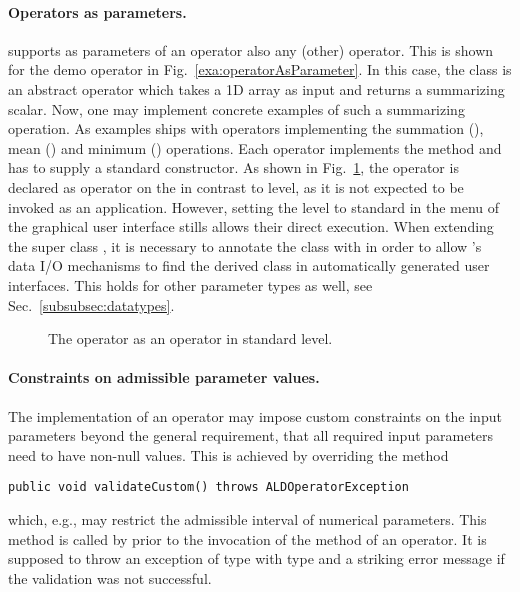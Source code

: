 \paragraph{Operators as parameters.}
\alida supports as parameters of an operator also any (other) \alida operator.
This is shown for the demo operator  in Fig.~\ref{exa:operatorAsParameter}.
In this case, the class  is an abstract operator 
which takes a 1D array as input and returns a summarizing scalar.
Now, one may implement concrete examples of such a summarizing operation. 
As examples \alida ships with operators implementing
the summation (), mean () and minimum
() operations.
Each operator implements the   method and has to supply a
standard constructor.
As shown in Fig.~\ref{exa:ALDArraySum},
the  operator  is declared as operator on the
 in contrast to  level, as
it is not expected to be invoked as an application.
However, setting the level to standard in the menu of the graphical user interface
stills allows their direct execution.
When extending the super class , it is necessary to
annotate the class with  in order to allow \alida's data
I/O mechanisms to find the derived class in automatically generated user
interfaces.
This holds for other parameter types as well, see Sec.~\ref{subsubsec:datatypes}.

\begin{figure}
\vspace{4mm}

\caption{\label{exa:ALDArraySum}The operator  as an operator in standard level.}
\end{figure}

\paragraph{Constraints on admissible parameter values.}

The implementation of an operator may impose 
custom constraints on the input parameters
beyond the general requirement, that all required input parameters
need to have non-null values.
This is achieved by overriding the method \\
\begin{lstlisting}[xrightmargin=.00\textwidth, xleftmargin=.0\textwidth,frame=single,numbers=none]
  public void validateCustom() throws ALDOperatorException
\end{lstlisting}
which, e.g., may restrict the admissible interval of numerical parameters.
This method is called by  prior to the invocation of the
 method of an operator. It is supposed to throw an exception
of type  with type  and
a striking error message if the validation was not successful.

